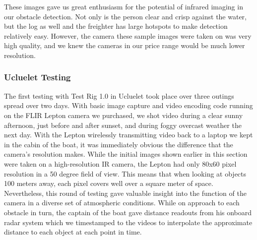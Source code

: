 These images gave us great enthusiasm for the potential of infrared imaging in our obstacle detection. Not only is the person clear and crisp against the water, but the log as well and the freighter has large hotspots to make detection relatively easy. However, the camera these sample images were taken on was very high quality, and we knew the cameras in our price range would be much lower resolution.

\subsubsection{\label{sec:discussion:results:testrig1}Ucluelet Testing}

The first testing with Test Rig 1.0 in Ucluelet took place over three outings spread over two days. With basic image capture and video encoding code running on the FLIR Lepton camera we purchased, we shot video during a clear sunny afternoon, just before and after sunset, and during foggy overcast weather the next day. With the Lepton wirelessly transmitting video back to a laptop we kept in the cabin of the boat, it was immediately obvious the difference that the camera's resolution makes. While the initial images shown earlier in this section were taken on a high-resolution IR camera, the Lepton had only 80x60 pixel resolution in a 50 degree field of view. This means that when looking at objects 100 meters away, each pixel covers well over a square meter of space. Nevertheless, this round of testing gave valuable insight into the function of the camera in a diverse set of atmospheric conditions. While on approach to each obstacle in turn, the captain of the boat gave distance readouts from his onboard radar system which we timestamped to the videos to interpolate the approximate distance to each object at each point in time.

